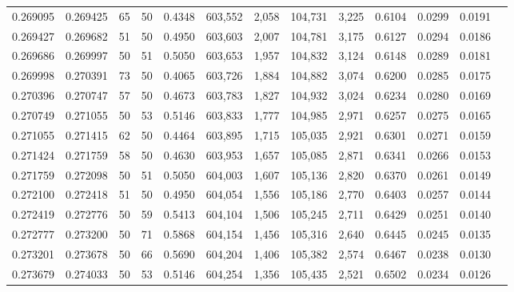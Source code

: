 \begin{tabular}{rrrrrrrrrrrrr}
0.269095 & 0.269425 &    65 &  50 &                                     0.4348 & 603,552 &   2,058 & 104,731 &   3,225 & 0.6104 & 0.0299 & 0.0191 \\
0.269427 & 0.269682 &    51 &  50 &                                     0.4950 & 603,603 &   2,007 & 104,781 &   3,175 & 0.6127 & 0.0294 & 0.0186 \\
0.269686 & 0.269997 &    50 &  51 &                                     0.5050 & 603,653 &   1,957 & 104,832 &   3,124 & 0.6148 & 0.0289 & 0.0181 \\
0.269998 & 0.270391 &    73 &  50 &                                     0.4065 & 603,726 &   1,884 & 104,882 &   3,074 & 0.6200 & 0.0285 & 0.0175 \\
0.270396 & 0.270747 &    57 &  50 &                                     0.4673 & 603,783 &   1,827 & 104,932 &   3,024 & 0.6234 & 0.0280 & 0.0169 \\
0.270749 & 0.271055 &    50 &  53 &                                     0.5146 & 603,833 &   1,777 & 104,985 &   2,971 & 0.6257 & 0.0275 & 0.0165 \\
0.271055 & 0.271415 &    62 &  50 &                                     0.4464 & 603,895 &   1,715 & 105,035 &   2,921 & 0.6301 & 0.0271 & 0.0159 \\
0.271424 & 0.271759 &    58 &  50 &                                     0.4630 & 603,953 &   1,657 & 105,085 &   2,871 & 0.6341 & 0.0266 & 0.0153 \\
0.271759 & 0.272098 &    50 &  51 &                                     0.5050 & 604,003 &   1,607 & 105,136 &   2,820 & 0.6370 & 0.0261 & 0.0149 \\
0.272100 & 0.272418 &    51 &  50 &                                     0.4950 & 604,054 &   1,556 & 105,186 &   2,770 & 0.6403 & 0.0257 & 0.0144 \\
0.272419 & 0.272776 &    50 &  59 &                                     0.5413 & 604,104 &   1,506 & 105,245 &   2,711 & 0.6429 & 0.0251 & 0.0140 \\
0.272777 & 0.273200 &    50 &  71 &                                     0.5868 & 604,154 &   1,456 & 105,316 &   2,640 & 0.6445 & 0.0245 & 0.0135 \\
0.273201 & 0.273678 &    50 &  66 &                                     0.5690 & 604,204 &   1,406 & 105,382 &   2,574 & 0.6467 & 0.0238 & 0.0130 \\
0.273679 & 0.274033 &    50 &  53 &                                     0.5146 & 604,254 &   1,356 & 105,435 &   2,521 & 0.6502 & 0.0234 & 0.0126 \\

\end{tabular}
